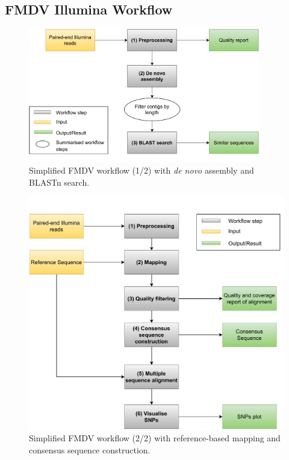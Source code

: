 \subsection{FMDV Illumina Workflow}\label{sec:fmdv-wf}
\begin{figure}[ht!]
	\centering
	\includegraphics[width=0.9\textwidth]{media/3-fmdv-1-2.pdf}
	\caption{Simplified FMDV workflow (1/2) with \textit{de novo} assembly and BLASTn search.}
	\label{fig:3-fmdv-wf-1}
\end{figure}
\begin{figure}[ht!]
	\centering
	\includegraphics[width=1\textwidth]{media/3-fmdv-2-2.pdf}
	\caption{Simplified \ac{FMDV} workflow (2/2) with reference-based mapping and consensus sequence construction.}
	\label{fig:3-fmdv-wf-2}
\end{figure}

